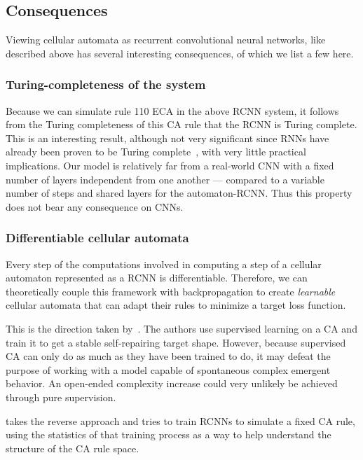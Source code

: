 \subsection{Consequences}

Viewing cellular automata as recurrent convolutional neural networks, like
described above has several interesting consequences, of which we list a few
here.

\subsubsection{Turing-completeness of the system}

Because we can simulate rule 110 ECA in the above RCNN system, it follows from
the Turing completeness of this CA rule that the RCNN is Turing complete. This
is an interesting result, although not very significant since \acp{RNN} have
already been proven to be Turing
complete~\parencite{siegelmannComputationalPowerNeural1992}, with very little
practical implications. Our model is relatively far from a real-world CNN with a
fixed number of layers independent from one another --- compared to a variable
number of steps and shared layers for the automaton-RCNN. Thus this property
does not bear any consequence on \acp{CNN}.

\subsubsection{Differentiable cellular automata}

Every step of the computations involved in computing a step of a cellular
automaton represented as a RCNN is differentiable. Therefore, we can
theoretically couple this framework with backpropagation to create
\emph{learnable} cellular automata that can adapt their rules to minimize a
target loss function.

This is the direction taken by~\textcite{mordvintsevGrowingNeuralCellular2020}.
The authors use supervised learning on a \ac{CA} and train it to get a stable
self-repairing target shape. However, because supervised \ac{CA} can only do as
much as they have been trained to do, it may defeat the purpose of working with
a model capable of spontaneous complex emergent behavior. An open-ended
complexity increase could very unlikely be achieved through pure supervision.

\textcite{gilpinCellularAutomataConvolutional2018} takes the reverse approach
and tries to train RCNNs to simulate a fixed \ac{CA} rule, using the statistics
of that training process as a way to help understand the structure of the
\ac{CA} rule space.

